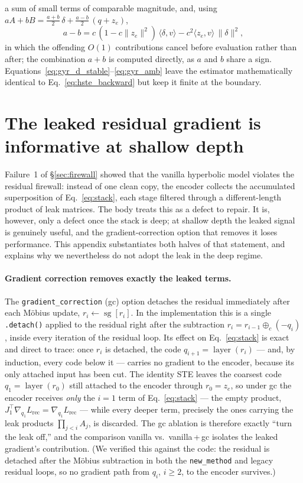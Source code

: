 \documentclass[12pt]{report}
\begin{document}
a sum of small terms of comparable magnitude, and, using $aA+bB = \tfrac{a+b}{2}\,\delta + \tfrac{a-b}{2}\,(q+z_e)$,
\begin{equation}
    \label{eq:gyr_amb}
    a-b = c\,(1-c\|z_e\|^2)\,\langle\delta,v\rangle - c^2\langle z_e,v\rangle\,\|\delta\|^2 ,
\end{equation}
in which the offending $O(1)$ contributions cancel before evaluation rather than after; the combination $a+b$ is computed directly, as $a$ and $b$ share a sign. Equations~\ref{eq:gyr_d_stable}--\ref{eq:gyr_amb} leave the estimator mathematically identical to Eq.~\ref{eq:hste_backward} but keep it finite at the boundary.

\section{The leaked residual gradient is informative at shallow depth}
\label{app:gc_leak}
Failure~1 of \S\ref{sec:firewall} showed that the vanilla hyperbolic model violates the residual firewall: instead of one clean copy, the encoder collects the accumulated superposition of Eq.~\ref{eq:stack}, each stage filtered through a different-length product of leak matrices. The body treats this as a defect to repair. It is, however, only a defect once the stack is deep; at shallow depth the leaked signal is genuinely useful, and the gradient-correction option that removes it loses performance. This appendix substantiates both halves of that statement, and explains why we nevertheless do not adopt the leak in the deep regime.

\paragraph{Gradient correction removes exactly the leaked terms.}
The \texttt{gradient\_correction} (gc) option detaches the residual immediately after each M\"obius update, $r_i\leftarrow\operatorname{sg}[r_i]$. In the implementation this is a single \texttt{.detach()} applied to the residual right after the subtraction $r_i=r_{i-1}\oplus_c(-q_i)$, inside every iteration of the residual loop. Its effect on Eq.~\ref{eq:stack} is exact and direct to trace: once $r_i$ is detached, the code $q_{i+1}=\operatorname{layer}(r_i)$ --- and, by induction, every code below it --- carries no gradient to the encoder, because its only attached input has been cut. The identity STE leaves the coarsest code $q_1=\operatorname{layer}(r_0)$ still attached to the encoder through $r_0=z_e$, so under gc the encoder receives \emph{only} the $i{=}1$ term of Eq.~\ref{eq:stack} --- the empty product, $J_1^{\top}\nabla_{q_1}L_{\text{rec}}=\nabla_{q_1}L_{\text{rec}}$ --- while every deeper term, precisely the ones carrying the leak products $\prod_{j<i}A_j$, is discarded. The gc ablation is therefore exactly ``turn the leak off,'' and the comparison vanilla vs.\ vanilla\,+\,gc isolates the leaked gradient's contribution. (We verified this against the code: the residual is detached after the M\"obius subtraction in both the \texttt{new\_method} and legacy residual loops, so no gradient path from $q_i$, $i\ge 2$, to the encoder survives.)
\end{document}
